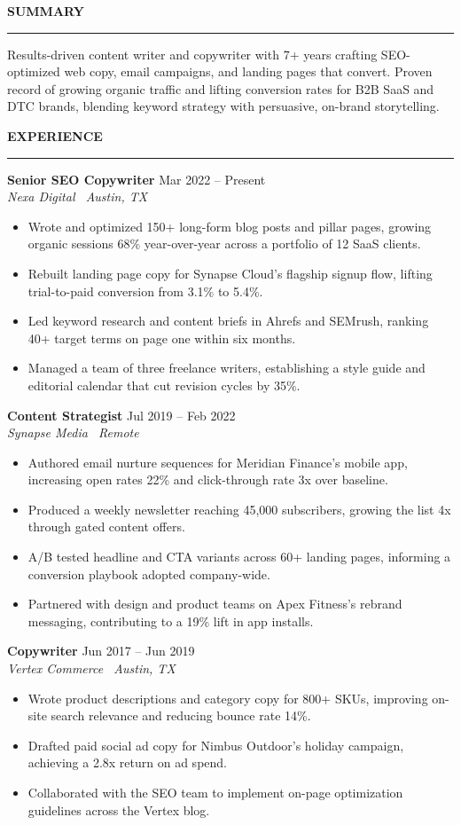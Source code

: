 \documentclass[10pt,a4paper]{article}
\newcommand{\sectionhead}[1]{%
  \vspace{2pt}%
  {\color{accent}\fontsize{10.5}{12}\selectfont\bfseries\MakeUppercase{#1}}\par
  {\color{ruleline}\rule{\linewidth}{0.9pt}}%
  \vspace{3pt}%
}
\newenvironment{tightlist}{%
  \begin{itemize}[leftmargin=11pt,itemsep=1.5pt,topsep=1pt,parsep=0pt,label={\small\textbullet}]
}{%
  \end{itemize}
}
\newcommand{\jobblock}[3]{%
  \textbf{\color{inkblack}#1} \hfill {\color{accent}\small #3}\\{}
  {\itshape\color{graytext}\small #2}\\[2pt]
}
\begin{document}
{\begin{minipage}[t]{0.335\textwidth}
\end{minipage}%
\hfill
\begin{minipage}[t]{0.62\textwidth}
\rule{0pt}{0pt}%
\sectionhead{Summary}
{\small\color{inkblack}
Results-driven content writer and copywriter with 7+ years crafting SEO-optimized web copy, email campaigns, and landing pages that convert. Proven record of growing organic traffic and lifting conversion rates for B2B SaaS and DTC brands, blending keyword strategy with persuasive, on-brand storytelling.
}

\vspace{7pt}
\sectionhead{Experience}

\jobblock{Senior SEO Copywriter}{Nexa Digital \textbar\ Austin, TX}{Mar 2022 -- Present}
\begin{tightlist}
\item Wrote and optimized 150+ long-form blog posts and pillar pages, growing organic sessions 68\% year-over-year across a portfolio of 12 SaaS clients.
\item Rebuilt landing page copy for Synapse Cloud's flagship signup flow, lifting trial-to-paid conversion from 3.1\% to 5.4\%.
\item Led keyword research and content briefs in Ahrefs and SEMrush, ranking 40+ target terms on page one within six months.
\item Managed a team of three freelance writers, establishing a style guide and editorial calendar that cut revision cycles by 35\%.
\end{tightlist}

\vspace{5pt}
\jobblock{Content Strategist}{Synapse Media \textbar\ Remote}{Jul 2019 -- Feb 2022}
\begin{tightlist}
\item Authored email nurture sequences for Meridian Finance's mobile app, increasing open rates 22\% and click-through rate 3x over baseline.
\item Produced a weekly newsletter reaching 45{,}000 subscribers, growing the list 4x through gated content offers.
\item A/B tested headline and CTA variants across 60+ landing pages, informing a conversion playbook adopted company-wide.
\item Partnered with design and product teams on Apex Fitness's rebrand messaging, contributing to a 19\% lift in app installs.
\end{tightlist}

\vspace{5pt}
\jobblock{Copywriter}{Vertex Commerce \textbar\ Austin, TX}{Jun 2017 -- Jun 2019}
\begin{tightlist}
\item Wrote product descriptions and category copy for 800+ SKUs, improving on-site search relevance and reducing bounce rate 14\%.
\item Drafted paid social ad copy for Nimbus Outdoor's holiday campaign, achieving a 2.8x return on ad spend.
\item Collaborated with the SEO team to implement on-page optimization guidelines across the Vertex blog.
\end{tightlist}


\end{minipage}}
\end{document}
